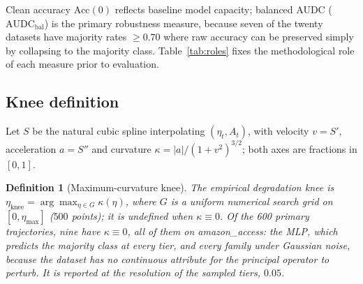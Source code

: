\documentclass[pdflatex,sn-mathphys]{sn-jnl}
\theoremstyle{thmstyleone}
\theoremstyle{thmstyletwo}
\theoremstyle{thmstylethree}
\newtheorem{definition}{Definition}
\newcommand{\Acc}{\mathrm{Acc}}
\newcommand{\AUDC}{\mathrm{AUDC}}
\newcommand{\etamax}{\eta_{\max}}
\newcommand{\etaknee}{\eta_{\mathrm{knee}}}
\begin{document}
Clean accuracy $\Acc(0)$ reflects baseline model capacity; balanced AUDC ($\AUDC_{\mathrm{bal}}$) is the primary robustness measure, because seven of the twenty datasets have majority rates $\ge 0.70$ where raw accuracy can be preserved simply by collapsing to the majority class. Table~\ref{tab:roles} fixes the methodological role of each measure prior to evaluation.

\subsection{Knee definition}\label{sec:problem:knee}

Let $S$ be the natural cubic spline interpolating $(\eta_t,A_t)$, with velocity $v=S'$, acceleration $a=S''$ and curvature $\kappa=\lvert a\rvert/(1+v^{2})^{3/2}$; both axes are fractions in $[0,1]$.

\begin{definition}[Maximum-curvature knee]\label{def:knee}
The empirical degradation knee is $\etaknee=\arg\max_{\eta\in G}\kappa(\eta)$, where $G$ is a uniform numerical search grid on $[0,\etamax]$ ($500$ points); it is undefined when $\kappa\equiv0$. Of the 600 primary trajectories, nine have $\kappa\equiv0$, all of them on amazon\_access: the MLP, which predicts the majority class at every tier, and every family under Gaussian noise, because the dataset has no continuous attribute for the principal operator to perturb. It is reported at the resolution of the sampled tiers, $0.05$.
\end{definition}
\end{document}
